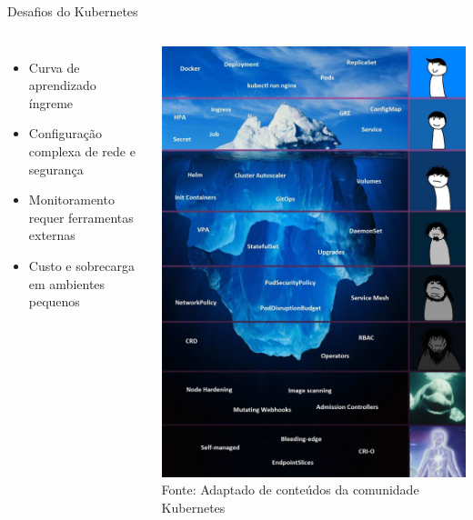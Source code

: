 \documentclass{beamer}
\begin{document}
\begin{frame}{Desafios do Kubernetes}
    \begin{columns}
        \begin{itemize}
            \item Curva de aprendizado íngreme
            \item Configuração complexa de rede e segurança
            \item Monitoramento requer ferramentas externas
            \item Custo e sobrecarga em ambientes pequenos
        \end{itemize}

        \centering
        \includegraphics[width=\textwidth]{k8s-iceberg.png}
        \\\tiny Fonte: Adaptado de conteúdos da comunidade Kubernetes
    \end{columns}
\end{frame}
\end{document}
